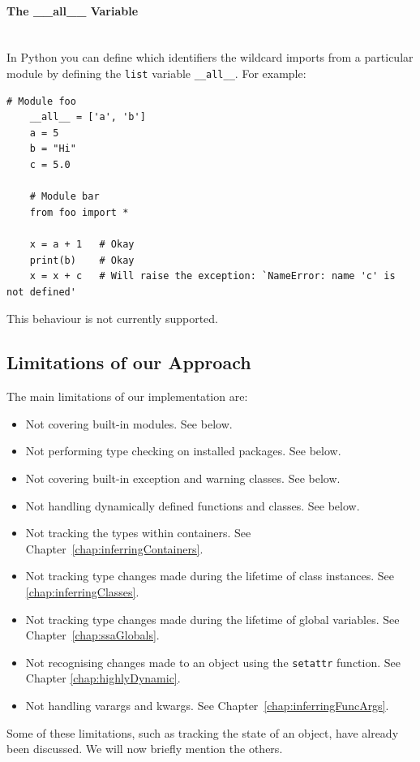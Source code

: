 \documentclass[12pt, titlepage]{article}
\begin{document}
\paragraph*{The \_\_all\_\_ Variable}\mbox{} \\
In Python you can define which identifiers the wildcard imports from a particular module by defining the \texttt{list} variable \texttt{\_\_all\_\_}. For example:
\begin{lstlisting}[mathescape]
    # Module foo 
    __all__ = ['a', 'b']
    a = 5
    b = "Hi"
    c = 5.0
    
    # Module bar
    from foo import *
    
    x = a + 1   # Okay
    print(b)    # Okay
    x = x + c   # Will raise the exception: `NameError: name 'c' is not defined'
\end{lstlisting}
This behaviour is not currently supported.


\subsection{Limitations of our Approach}
\label{chap:limitations}
The main limitations of our implementation are:
\begin{itemize}
	\item Not covering built-in modules. See below.
	\item Not performing type checking on installed packages. See below.
	\item Not covering built-in exception and warning classes. See below.
	\item Not handling dynamically defined functions and classes. See below.
	\item Not tracking the types within containers. See Chapter~\ref{chap:inferringContainers}.
	\item Not tracking type changes made during the lifetime of class instances. See \ref{chap:inferringClasses}.
	\item Not tracking type changes made during the lifetime of global variables. See Chapter~\ref{chap:ssaGlobals}.
	\item Not recognising changes made to an object using the \texttt{setattr} function. See Chapter \ref{chap:highlyDynamic}.
	\item Not handling varargs and kwargs. See Chapter~\ref{chap:inferringFuncArgs}.
\end{itemize}
Some of these limitations, such as tracking the state of an object, have already been discussed. We will now briefly mention the others.
\end{document}

